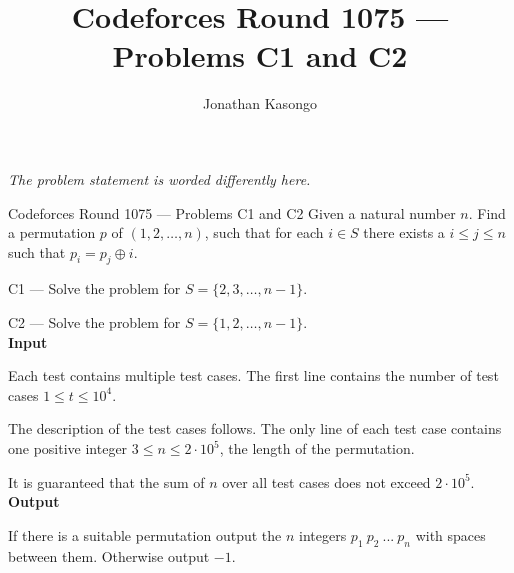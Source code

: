 \documentclass{article}
\author{Jonathan Kasongo}
\title{Codeforces Round 1075 --- Problems C1 and C2}
\begin{document}
\maketitle
\textit{The problem statement is worded differently here.}
\begin{problem}{Codeforces Round 1075 --- Problems C1 and C2}
Given a natural number $n$. Find a permutation $p$ of $(1,2,\ldots, n)$,
such that for each $i \in S$ there exists a $i \leq j \leq n$
such that $p_i = p_j \oplus i$.\vspace{0.2cm}

C1 --- Solve the problem for $S = \{2, 3, \ldots, n-1\}$.\vspace{0.2cm}

C2 --- Solve the problem for $S = \{ 1, 2, \ldots, n-1\}$.\\

\textbf{Input}

Each test contains multiple test cases. The first line contains the number
of test cases $1 \leq t \leq 10^4$.\vspace{0.2cm}

The description of the test cases follows.
The only line of each test case contains one positive integer
$3 \leq n \leq 2 \cdot 10^5$, the length of the permutation. \vspace{0.2cm}

It is guaranteed that the sum of $n$ over all test cases does not exceed
$2 \cdot 10^5$.\\

\textbf{Output}

If there is a suitable permutation output the $n$ integers
$p_1 \ p_2 \ ...\ p_n$ with spaces between them. Otherwise output $-1$.
\end{problem}
\end{document}

